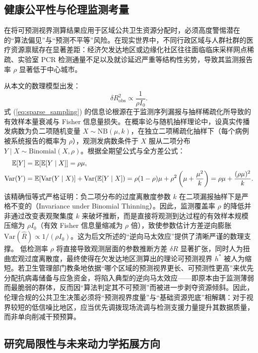 \documentclass[11pt,a4paper]{article}
\theoremstyle{plain}
\theoremstyle{definition}
\begin{document}
\subsection{健康公平性与伦理监测考量}

在将可预测视界测算结果应用于区域公共卫生资源分配时，必须高度警惕潜在的“算法偏见”与“预测不平等”风险。在现实世界中，不同行政区域与人群社群的医疗资源禀赋存在显著差距：经济欠发达地区或边缘化社区往往面临临床采样网点稀疏、实验室 PCR 检测通量不足以及就诊延迟严重等结构性劣势，导致其监测报告率 $\rho$ 显著低于中心城市。

从本文的数理模型出发：
\begin{equation}
\delta R_{\text{obs}}^2 \propto \frac{1}{\rho I_0}.
\label{eq:sparse_sampling}
\end{equation}
式 (\ref{eq:sparse_sampling}) 的信息论根源在于监测序列漏报与抽样稀疏化所导致的有效样本量衰减与 Fisher 信息量损失。在概率论与随机抽样理论中，设真实传播发病数为负二项随机变量 $X \sim \text{NB}(\mu, k)$，在独立二项稀疏化抽样下（每个病例被系统报告的概率为 $\rho$），观测发病数条件于 $X$ 服从二项分布 $Y \mid X \sim \text{Binomial}(X, \rho)$。根据全期望公式与全方差公式：
\begin{align}
\mathbb{E}[Y] &= \mathbb{E}[\mathbb{E}[Y \mid X]] = \rho \mu, \notag \\
\text{Var}(Y) &= \mathbb{E}[\text{Var}(Y \mid X)] + \text{Var}(\mathbb{E}[Y \mid X]) = \rho(1-\rho)\mu + \rho^2\left(\mu + \frac{\mu^2}{k}\right) = \rho\mu + \frac{(\rho\mu)^2}{k}.
\end{align}
该精确恒等式严格证明：负二项分布的过度离散度参数 $k$ 在二项漏报抽样下是严格不变的（Invariance under Binomial Thinning）。因此，监测覆盖率 $\rho$ 的降低并非通过改变表观聚集度 $k$ 来破坏推断，而是直接将观测到达过程的有效样本规模压缩为 $\rho I_0$（有效 Fisher 信息量缩减为 $\rho$ 倍），致使参数估计方差逆向膨胀 $\text{Var}(\hat{R}) \propto 1/(\rho I_0)$。这为后文所述的“逆向马太效应”提供了清晰严谨的数理支撑。
低检测率 $\rho$ 将直接导致观测层面的参数推断方差 $\delta R$ 显著扩张，同时人为扭曲宏观过度离散度，最终使得在欠发达地区测算出的理论可预测视界 $h^*$ 被人为缩短。若卫生管理部门教条地依据“哪个区域的预测视界更长、可预测性更高”来优先分配抗病毒储备与应急资金，将陷入典型的逆向马太效应——即原本由于监测薄弱而最脆弱的群体，反而因“算法判定其不可预测”而被进一步剥夺资源倾斜。因此，伦理合规的公共卫生决策必须将“预测视界度量”与“基础资源兜底”相解耦：对于视界较短的低信噪比地区，应当优先调拨现场流调与检测支援力量提升其数据质量，而非单向削减干预预算。

\subsection{研究局限性与未来动力学拓展方向}
\end{document}
